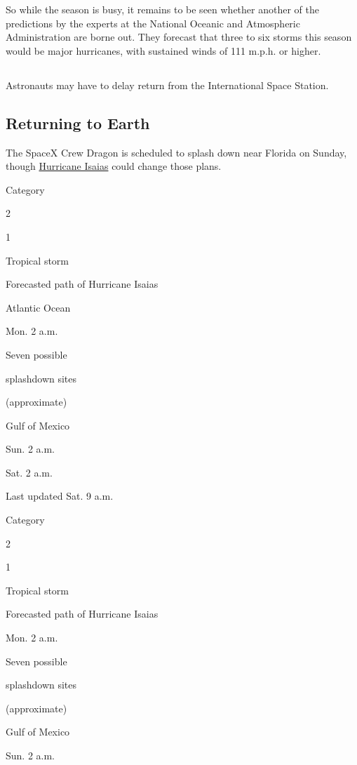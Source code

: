 So while the season is busy, it remains to be seen whether another of
the predictions by the experts at the National Oceanic and Atmospheric
Administration are borne out. They forecast that three to six storms
this season would be major hurricanes, with sustained winds of 111
m.p.h. or higher.

\hypertarget{-5}{%
\subsection{}\label{-5}}

Astronauts may have to delay return from the International Space
Station.

\hypertarget{returning-to-earth}{%
\subsection{Returning to Earth}\label{returning-to-earth}}

The SpaceX Crew Dragon is scheduled to splash down near Florida on
Sunday, though
\href{https://www.nytimes.com/interactive/2020/07/31/us/hurricane-isaias-tracker-map.html}{Hurricane
Isaias} could change those plans.

Category

2

1

Tropical storm

Forecasted path of Hurricane Isaias

Atlantic Ocean

Mon. 2 a.m.

Seven possible

splashdown sites

(approximate)

Gulf of Mexico

Sun. 2 a.m.

Sat. 2 a.m.

Last updated Sat. 9 a.m.

Category

2

1

Tropical storm

Forecasted path of Hurricane Isaias

Mon. 2 a.m.

Seven possible

splashdown sites

(approximate)

Gulf of Mexico

Sun. 2 a.m.

